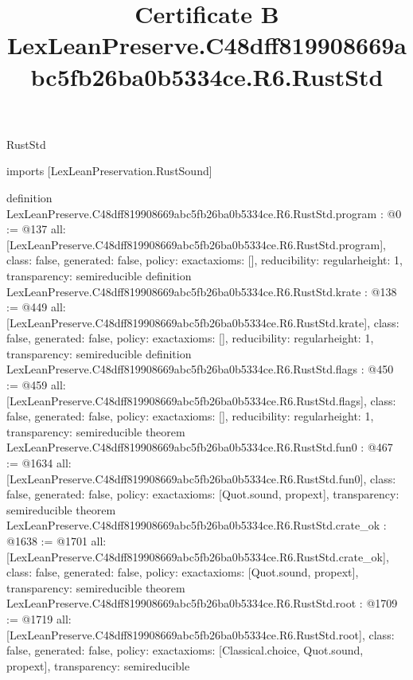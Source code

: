 \begin{lexlean}{RustStd}
\title{Certificate B LexLeanPreserve.C48dff819908669abc5fb26ba0b5334ce.R6.RustStd}
\begin{coremodule}
imports [LexLeanPreservation.RustSound]

definition LexLeanPreserve.C48dff819908669abc5fb26ba0b5334ce.R6.RustStd.program : @0 := @137 {
  all: [LexLeanPreserve.C48dff819908669abc5fb26ba0b5334ce.R6.RustStd.program],
  class: false,
  generated: false,
  policy: exact{axioms: []},
  reducibility: regular{height: 1},
  transparency: semireducible
}
definition LexLeanPreserve.C48dff819908669abc5fb26ba0b5334ce.R6.RustStd.krate : @138 := @449 {
  all: [LexLeanPreserve.C48dff819908669abc5fb26ba0b5334ce.R6.RustStd.krate],
  class: false,
  generated: false,
  policy: exact{axioms: []},
  reducibility: regular{height: 1},
  transparency: semireducible
}
definition LexLeanPreserve.C48dff819908669abc5fb26ba0b5334ce.R6.RustStd.flags : @450 := @459 {
  all: [LexLeanPreserve.C48dff819908669abc5fb26ba0b5334ce.R6.RustStd.flags],
  class: false,
  generated: false,
  policy: exact{axioms: []},
  reducibility: regular{height: 1},
  transparency: semireducible
}
theorem LexLeanPreserve.C48dff819908669abc5fb26ba0b5334ce.R6.RustStd.fun0 : @467 := @1634 {
  all: [LexLeanPreserve.C48dff819908669abc5fb26ba0b5334ce.R6.RustStd.fun0],
  class: false,
  generated: false,
  policy: exact{axioms: [Quot.sound, propext]},
  transparency: semireducible
}
theorem LexLeanPreserve.C48dff819908669abc5fb26ba0b5334ce.R6.RustStd.crate_ok : @1638 := @1701 {
  all: [LexLeanPreserve.C48dff819908669abc5fb26ba0b5334ce.R6.RustStd.crate_ok],
  class: false,
  generated: false,
  policy: exact{axioms: [Quot.sound, propext]},
  transparency: semireducible
}
theorem LexLeanPreserve.C48dff819908669abc5fb26ba0b5334ce.R6.RustStd.root : @1709 := @1719 {
  all: [LexLeanPreserve.C48dff819908669abc5fb26ba0b5334ce.R6.RustStd.root],
  class: false,
  generated: false,
  policy: exact{axioms: [Classical.choice, Quot.sound, propext]},
  transparency: semireducible
}


\end{coremodule}
\end{lexlean}
